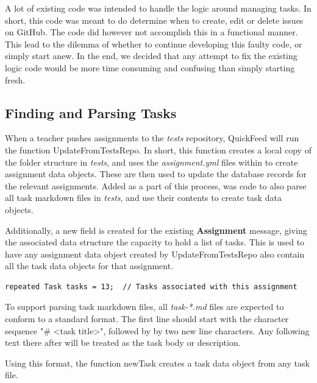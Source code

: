 A lot of existing code was intended to handle the logic around managing tasks. 
In short, this code was meant to do determine when to create, edit or delete issues on GitHub.
The code did however not accomplish this in a functional manner.
This lead to the dilemma of whether to continue developing this faulty code, or simply start anew.
In the end, we decided that any attempt to fix the existing logic code would be more time consuming and confusing than simply starting fresh.

\subsection{Finding and Parsing Tasks}
\label{sec:parsing_tasks}

When a teacher pushes assignments to the \textit{tests} repository, QuickFeed will run the function UpdateFromTestsRepo.
In short, this function creates a local copy of the folder structure in \textit{tests}, and uses the \textit{assignment.yml} files within to create assignment data objects.
These are then used to update the database records for the relevant assignments.
Added as a part of this process, was code to also parse all task markdown files in \textit{tests}, and use their contents to create task data objects.

Additionally, a new field is created for the existing \textbf{Assignment} message, giving the associated data structure the capacity to hold a list of tasks.
This is used to have any assignment data object created by UpdateFromTestsRepo also contain all the task data objects for that assignment.
\begin{lstlisting}[caption={Modification to the Assignment message}, numbers=none]
repeated Task tasks = 13;  // Tasks associated with this assignment
\end{lstlisting}

To support parsing task markdown files, all \textit{task-*.md} files are expected to conform to a standard format.
The first line should start with the character sequence "\# <task title>", followed by by two new line characters.
Any following text there after will be treated as the task body or description.

Using this format, the function newTask creates a task data object from any task file.



